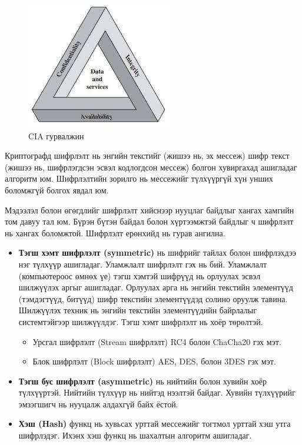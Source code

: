 \begin{figure}[ht]
\centering
\includegraphics[scale=0.7]{Figures/cia_traid}
\caption[CIA гурвалжин]{CIA гурвалжин}
\label{fig:CIA}
\end{figure}

Криптографд шифрлэлт нь энгийн текстийг (жишээ нь, эх мессеж) шифр текст (жишээ нь, шифрлэгдсэн эсвэл кодлогдсон мессеж) болгон хувиргахад ашигладаг алгоритм юм. Шифрлэлтийн зорилго нь мессежийг түлхүүргүй хүн унших боломжгүй болгох явдал юм.

Мэдээлэл болон өгөгдлийг шифрлэлт хийснээр нууцлаг байдлыг хангах хамгийн том давуу тал юм. Бүрэн бүтэн байдал болон хүртээмжтэй байдлыг ч шифрлэлт нь хангах боломжтой.
Шифрлэлт ерөнхийд нь гурав ангилна.
\begin{itemize}
    \item \textbf{Тэгш хэмт шифрлэлт (symmetric)} нь шифрийг тайлах болон шифрлэхдээ нэг түлхүүр ашигладаг. Уламжлалт шифрлэлт гэх нь бий. Уламжлалт (компьютероос өмнөх үе) тэгш хэмтэй шифрүүд нь орлуулах эсвэл шилжүүлэх аргыг ашигладаг. Орлуулах арга нь энгийн текстийн элементүүд (тэмдэгтүүд, битүүд) шифр текстийн элементүүдэд солино оруулж тавина. Шилжүүлэх техник нь энгийн текстийн элементүүдийн байрлалыг системтэйгээр шилжүүлдэг. 
    Тэгш хэмт шифрлэлт нь хоёр төрөлтэй.
    \begin{itemize}
        \item Урсгал шифрлэлт (Stream шифрлэлт) RC4 болон ChaCha20 гэх мэт.
        \item Блок шифрлэлт (Block шифрлэлт) AES, DES, болон 3DES гэх мэт.
    \end{itemize}
    \item \textbf{Тэгш бус шифрлэлт (asymmetric)} нь нийтийн болон хувийн хоёр түлхүүртэй. Нийтийн түлхүүр нь нийтэд нээлтэй байдаг. Хувийн түлхүүрийг эмзэгшигч нь нууцалж алдахгүй байх ёстой. 
    \item \textbf{Хэш (Hash)} функц нь хувьсах урттай мессежийг тогтмол урттай хэш утга шифрлэдэг. Ихэнх хэш функц нь шахалтын алгоритм ашигладаг.
\end{itemize}

